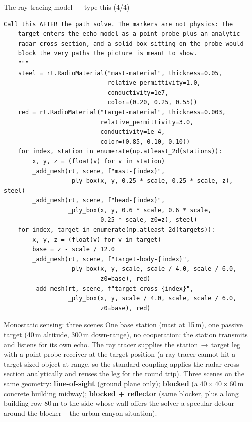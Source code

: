 \documentclass[10pt]{beamer}
\begin{document}
\begin{frame}[fragile]{The ray-tracing model --- type this (4/4)}
\begin{lstlisting}[basicstyle=\ttfamily\tiny]
    Call this AFTER the path solve. The markers are not physics: the
    target enters the echo model as a point probe plus an analytic
    radar cross-section, and a solid box sitting on the probe would
    block the very paths the picture is meant to show.
    """
    steel = rt.RadioMaterial("mast-material", thickness=0.05,
                             relative_permittivity=1.0,
                             conductivity=1e7,
                             color=(0.20, 0.25, 0.55))
    red = rt.RadioMaterial("target-material", thickness=0.003,
                           relative_permittivity=3.0,
                           conductivity=1e-4,
                           color=(0.85, 0.10, 0.10))
    for index, station in enumerate(np.atleast_2d(stations)):
        x, y, z = (float(v) for v in station)
        _add_mesh(rt, scene, f"mast-{index}",
                  _ply_box(x, y, 0.25 * scale, 0.25 * scale, z), steel)
        _add_mesh(rt, scene, f"head-{index}",
                  _ply_box(x, y, 0.6 * scale, 0.6 * scale,
                           0.25 * scale, z0=z), steel)
    for index, target in enumerate(np.atleast_2d(targets)):
        x, y, z = (float(v) for v in target)
        base = z - scale / 12.0
        _add_mesh(rt, scene, f"target-body-{index}",
                  _ply_box(x, y, scale, scale / 4.0, scale / 6.0,
                           z0=base), red)
        _add_mesh(rt, scene, f"target-cross-{index}",
                  _ply_box(x, y, scale / 4.0, scale, scale / 6.0,
                           z0=base), red)
\end{lstlisting}
\end{frame}

\begin{frame}{Monostatic sensing: three scenes}
  One base station (mast at 15\,m), one passive target
  (40\,m altitude, 300\,m down-range), no cooperation: the
  station transmits and listens for its own echo. The ray
  tracer supplies the station\,$\to$\,target leg with a
  point probe receiver at the target position (a ray tracer
  cannot hit a target-sized object at range, so the
  standard coupling applies the radar cross-section
  analytically and reuses the leg for the round trip).
  Three scenes on the same geometry: \textbf{line-of-sight}
  (ground plane only); \textbf{blocked} (a
  $40{\times}40{\times}60$\,m concrete building midway);
  \textbf{blocked + reflector} (same blocker, plus a long
  building row 80\,m to the side whose wall offers the
  solver a specular detour around the blocker -- the urban
  canyon situation).
\end{frame}
\end{document}
